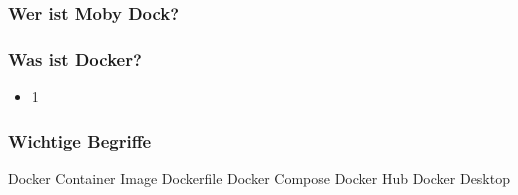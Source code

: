 \documentclass[22pt,handout]{beamer}
\begin{document}
\begin{frame}[t]
    \frametitle{Wer ist Moby Dock?}\pause
\end{frame}

\begin{frame}[t]
    \frametitle{Was ist Docker?}
    \begin{itemize}
        \item 1
    \end{itemize} 
\end{frame}

\begin{frame}[t]
    \frametitle{Wichtige Begriffe}
    Docker
    Container
    Image
    Dockerfile
    Docker Compose
    Docker Hub
    Docker Desktop
\end{frame}
\end{document}
